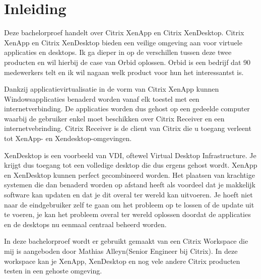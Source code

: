 
\chapter{Inleiding}
\label{ch:inleiding}
Deze bachelorproef handelt over Citrix XenApp en Citrix XenDesktop. Citrix XenApp en Citrix XenDesktop bieden een veilige omgeving aan voor virtuele applicaties en desktops. Ik ga dieper in op de verschillen tussen deze twee producten en wil hierbij de case van Orbid oplossen. Orbid is een bedrijf dat 90 medewerkers telt en ik wil nagaan welk product voor hun het interessantst is.

Dankzij applicatievirtualisatie in de vorm van Citrix XenApp kunnen Windowsapplicaties benaderd worden vanaf elk toestel met een internetverbinding. De applicaties worden dus gehost op een gedeelde computer waarbij de gebruiker enkel moet beschikken over Citrix Receiver en een internetvebrinding. Citrix Receiver is de client van Citrix die u toegang verleent tot XenApp- en Xendesktop-omgevingen.

XenDesktop is een voorbeeld van VDI, oftewel Virtual Desktop Infrastructure. Je krijgt dus toegang tot een volledige desktop die dus ergens gehost wordt. XenApp en XenDesktop kunnen perfect gecombineerd worden. Het plaatsen van krachtige systemen die dan benaderd worden op afstand heeft als voordeel dat je makkelijk software kan updaten en dat je dit overal ter wereld kan uitvoeren. Je hoeft niet naar de eindgebruiker zelf te gaan om het probleem op te lossen of de update uit te voeren, je kan het probleem overal ter wereld oplossen doordat de applicaties en de desktops nu eenmaal centraal beheerd worden.

In deze bachelorproef wordt er gebruikt gemaakt van een Citrix Workspace die mij is aangeboden door Mathias Alleyn(Senior Engineer bij Citrix). In deze workspace kan je XenApp, XenDesktop en nog vele andere Citrix producten testen in een gehoste omgeving.

